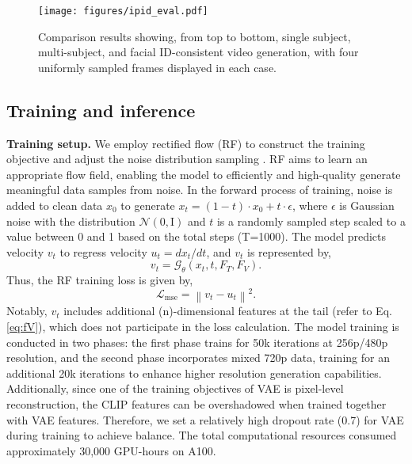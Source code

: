 \begin{figure*}[t]
	\centering
	\texttt{[image: figures/ipid\_eval.pdf]} 
	\caption{Comparison results showing, from top to bottom, single subject, multi-subject, and facial ID-consistent video generation, with four uniformly sampled frames displayed in each case.}
	\label{fig:ipid_eval}
\end{figure*}


\subsection{Training and inference}
\label{sec:method:train}

\textbf{Training setup.} 
We employ rectified flow (RF) \cite{liu2022flow,lipman2022flow} to construct the training objective and adjust the noise distribution sampling \cite{esser2024scaling}. RF aims to learn an appropriate flow field, enabling the model to efficiently and high-quality generate meaningful data samples from noise.
In the forward process of training, noise is added to clean data $x_0$ to generate $x_t = (1-t) \cdot x_0 + t \cdot \epsilon $, where $\epsilon$ is Gaussian noise with the distribution $\mathcal{N}(0, \text{I})$ and $t$ is a randomly sampled step scaled to a value between 0 and 1 based on the total steps (T=1000). 
The model predicts velocity $v_t$ to regress velocity $u_t = dx_t/dt$, and $v_t$ is represented by,
\begin{equation} 
v_t = \mathcal{G}_\theta (x_t, t, F_T, F_V).
\end{equation}
Thus, the RF training loss is given by,
\begin{equation} 
\mathcal{L}_{\text{mse}} = {\left \| v_t  - u_t \right \|}^{2}.
\end{equation} 
Notably, $v_t$ includes additional (n)-dimensional features at the tail (refer to Eq.\ref{eq:fV}), which does not participate in the loss calculation.
The model training is conducted in two phases: the first phase trains for 50k iterations at 256p/480p resolution, and the second phase incorporates mixed 720p data, training for an additional 20k iterations to enhance higher resolution generation capabilities. Additionally, since one of the training objectives of VAE is pixel-level reconstruction, the CLIP features can be overshadowed when trained together with VAE features. Therefore, we set a relatively high dropout rate (0.7) for VAE during training to achieve balance. The total computational resources consumed approximately 30,000 GPU-hours on A100.


